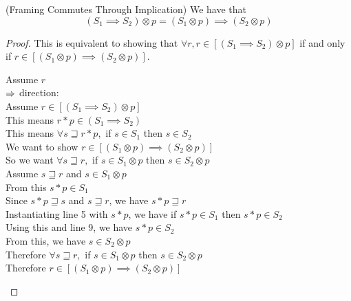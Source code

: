 \begin{lemma}{(Framing Commutes Through Implication)}
We have that
\begin{displaymath}
  (S_1 \implies S_2) \otimes p = (S_1 \otimes p) \implies (S_2 \otimes p) 
\end{displaymath}
\end{lemma}

\begin{proof}
This is equivalent to showing that $\forall r, r \in [(S_1 \implies S_2) \otimes p]$ if and
only if $r \in [(S_1 \otimes p) \implies (S_2 \otimes p)]$. 

\begin{tabbedproof}
\oo Assume $r$ \\
\ooo $\Rightarrow$ direction:\\
\oooo Assume $r \in [(S_1 \implies S_2) \otimes p]$ \\
\ooooo This means $r * p \in (S_1 \implies S_2)$ \\
\ooooo This means $\forall s \sqsupseteq r * p,$ if $s \in S_1$ then $s \in S_2$ \\
\ooooo We want to show $r \in [(S_1 \otimes p) \implies (S_2 \otimes p)]$ \\
\ooooo So we want $\forall s \sqsupseteq r,$ if  $s \in S_1 \otimes p$ then $s \in S_2 \otimes p$ \\
\ooooo Assume $s \sqsupseteq r$ and $s \in S_1 \otimes p$ \\
\oooooo From this $s * p \in S_1$ \\ 
\oooooo Since $s * p \sqsupseteq s$ and $s \sqsupseteq r$, we have $s * p \sqsupseteq r$ \\
\oooooo Instantiating line 5 with $s * p$, we have if $s * p \in S_1$ then $s * p \in S_2$ \\
\oooooo Using this and line 9, we have $s * p \in S_2$ \\
\oooooo From this, we have $s \in S_2 \otimes p$ \\
\ooooo Therefore $\forall s \sqsupseteq r,$ if  $s \in S_1 \otimes p$ then $s \in S_2 \otimes p$ \\
\ooooo Therefore $r \in [(S_1 \otimes p) \implies (S_2 \otimes p)]$ \\


\end{tabbedproof}
\end{proof}
